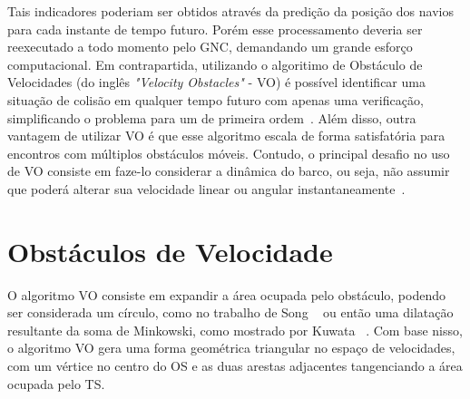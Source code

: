         Tais indicadores poderiam ser obtidos através da predição da posição dos navios para cada instante de tempo futuro. Porém esse processamento deveria ser reexecutado a todo momento pelo GNC, demandando um grande esforço computacional. Em contrapartida, utilizando o algoritimo de Obstáculo de Velocidades (do inglês \textit{"Velocity Obstacles"} - VO) é possível identificar uma situação de colisão em qualquer tempo futuro com apenas uma verificação, simplificando o problema para um de primeira ordem~\cite{KUWATA2014110}. Além disso, outra vantagem de utilizar VO é que esse algoritmo escala de forma satisfatória para encontros com múltiplos obstáculos móveis. Contudo, o principal desafio no uso de VO consiste em faze-lo considerar a dinâmica do barco, ou seja, não assumir que poderá alterar sua velocidade linear ou angular instantaneamente~\cite{HUANG2019142}.
        
    \section{Obstáculos de Velocidade}\label{subchap2:vo}
        O algoritmo VO consiste em expandir a área ocupada pelo obstáculo, podendo ser considerada um círculo, como no trabalho de Song \etal~\cite{SONG2018351} ou então uma dilatação resultante da soma de Minkowski, como mostrado por Kuwata \etal~\cite{KUWATA2014110}. Com base nisso, o algoritmo VO gera uma forma geométrica triangular no espaço de velocidades, com um vértice no centro do OS e as duas arestas adjacentes tangenciando a área ocupada pelo TS.
        
        